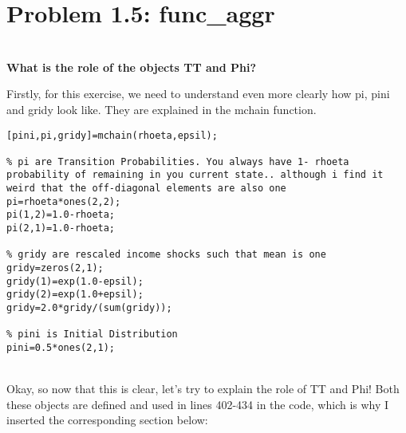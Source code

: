 \documentclass[12pt,a4paper]{article}
\begin{document}

\section*{Problem 1.5: func\_aggr}\\
\textbf{What is the role of the objects TT and Phi?}

Firstly, for this exercise, we need to understand even more clearly how pi, pini and gridy look like. They are explained in the mchain function. 
\begin{lstlisting}
[pini,pi,gridy]=mchain(rhoeta,epsil);

% pi are Transition Probabilities. You always have 1- rhoeta probability of remaining in you current state.. although i find it weird that the off-diagonal elements are also one
pi=rhoeta*ones(2,2);
pi(1,2)=1.0-rhoeta;
pi(2,1)=1.0-rhoeta;

% gridy are rescaled income shocks such that mean is one
gridy=zeros(2,1);
gridy(1)=exp(1.0-epsil);
gridy(2)=exp(1.0+epsil);
gridy=2.0*gridy/(sum(gridy));

% pini is Initial Distribution
pini=0.5*ones(2,1);
\end{lstlisting}
\\
Okay, so now that this is clear, let's try to explain the role of TT and Phi! Both these objects are defined and used in lines 402-434 in the code, which is why I inserted the corresponding section below:\\
\end{document}
